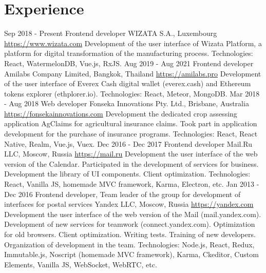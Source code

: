 \documentclass[11pt,a4paper]{moderncv}
\begin{document}
\newpage

\section{Experience}
\cventry
  {Sep 2018 - Present}
  {Frontend developer}
  {WIZATA S.A., Luxembourg}
  {\newline{}\url{https://www.wizata.com}}{}
  {Development of the user interface of Wizata Platform, a platform for digital transformation of the manufacturing process.\newline{}
  Technologies: React, WatermelonDB, Vue.js, RxJS.}
\cventry
  {Aug 2019 - Aug 2021}
  {Frontend developer}
  {Amilabs Company Limited, Bangkok, Thailand}
  {\newline{}\url{https://amilabs.pro}}{}
  {Development of the user interface of Everex Cash digital wallet (everex.cash) and Ethereum tokens explorer (ethplorer.io).\newline{}
  Technologies: React, Meteor, MongoDB.}
\cventry
  {Mar 2018 - Aug 2018}
  {Web developer}
  {Fonseka Innovations Pty. Ltd., Brisbane, Australia}
  {\newline{}\url{https://fonsekainnovations.com}}{}
  {Development the dedicated crop assessing application AgClaims for agricultural insurance claims.\newline{}
  Took part in application development for the purchase of insurance programs.\newline{}
  Technologies: React, React Native, Realm, Vue.js, Vuex.}
\cventry
  {Dec 2016 - Dec 2017}
  {Frontend developer}
  {Mail.Ru LLC, Moscow, Russia}
  {\newline{}\url{https://mail.ru}}{}
  {Development the user interface of the web version of the Calendar.\newline{}
  Participated in the development of services for business.\newline{}
  Development the library of UI components. Client optimization.\newline{}
  Technologies: React, Vanilla JS, homemade MVC framework, Karma, Electron, etc.}
\cventry
  {Jan 2013 - Dec 2016}
  {Frontend developer, Team leader of the group for development of interfaces for postal services}
  {Yandex LLC, Moscow, Russia}
  {\newline{}\url{https://yandex.com}}{}
  {Development the user interface of the web version of the Mail (mail.yandex.com).\newline{}
  Development of new services for teamwork (connect.yandex.com).\newline{}
  Optimization for old browsers. Client optimization. Writing tests.\newline{}
  Training of new developers. Organization of development in the team.\newline{}
  Technologies: Node.js, React, Redux, Immutable.js, Noscript (homemade MVC framework), Karma, Ckeditor, Custom Elements, Vanilla JS, WebSocket, WebRTC, etc.}
\end{document}

